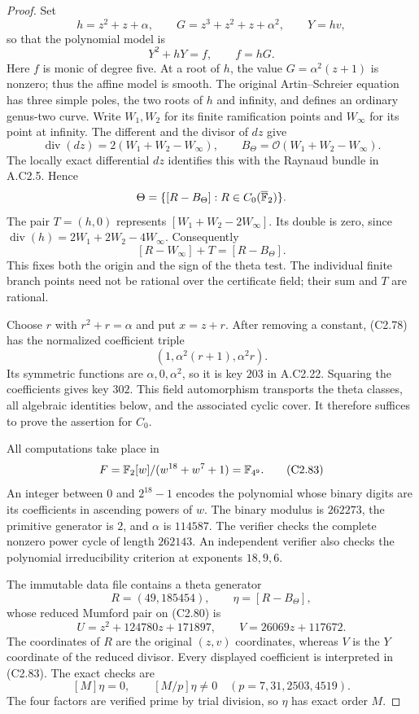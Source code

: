 \begin{proof}
Set
\[
 h=z^2+z+\alpha,\qquad G=z^3+z^2+z+\alpha^2,
 \qquad Y=hv,
\]
so that the polynomial model is
\[
                         Y^2+hY=f,\qquad f=hG.             \tag{C2.80}
\]
Here $f$ is monic of degree five. At a root
of $h$, the value $G=\alpha^2(z+1)$ is nonzero;
thus the affine model is smooth. The original
Artin--Schreier equation has three simple poles,
the two roots of $h$ and infinity, and defines
an ordinary genus-two curve. Write $W_1,W_2$
for its finite ramification points and $W_\infty$
for its point at infinity. The different and
the divisor of $dz$ give
\[
 \operatorname{div}(dz)=2(W_1+W_2-W_\infty),\qquad
 B_\Theta=\mathcal O(W_1+W_2-W_\infty).                     \tag{C2.81}
\]
The locally exact differential $dz$ identifies
this with the Raynaud bundle in A.C2.5. Hence
\[
 \Theta=\{[R-B_\Theta]:R\in C_0(\overline{\mathbb F}_2)\}.
\]
The pair $T=(h,0)$ represents
$[W_1+W_2-2W_\infty]$. Its double is zero,
since $\operatorname{div}(h)=2W_1+2W_2-4W_\infty$.
Consequently
\[
                  [R-W_\infty]+T=[R-B_\Theta].             \tag{C2.82}
\]
This fixes both the origin and the sign of the
theta test. The individual finite branch points
need not be rational over the certificate field;
their sum and $T$ are rational.

Choose $r$ with $r^2+r=\alpha$ and put $x=z+r$.
After removing a constant, (C2.78) has the
normalized coefficient triple
\[
                 (1,\alpha^2(r+1),\alpha^2r).
\]
Its symmetric functions are $\alpha,0,\alpha^2$,
so it is key $203$ in A.C2.22. Squaring the
coefficients gives key $302$. This field
automorphism transports the theta classes,
all algebraic identities below, and the
associated cyclic cover. It therefore suffices
to prove the assertion for $C_0$.

All computations take place in
\[
 F=\mathbb F_2[w]/(w^{18}+w^7+1)=\mathbb F_{4^9}.                         \tag{C2.83}
\]
An integer between $0$ and $2^{18}-1$ encodes
the polynomial whose binary digits are its
coefficients in ascending powers of $w$.
The binary modulus is $262273$, the primitive
generator is $2$, and $\alpha$ is $114587$.
The verifier checks the complete nonzero
power cycle of length $262143$. An independent
verifier also checks the polynomial
irreducibility criterion at exponents $18,9,6$.

The immutable data file
contains a theta generator
\[
 R=(49,185454),\qquad \eta=[R-B_\Theta],
\]
whose reduced Mumford pair on (C2.80) is
\[
 U=z^2+124780z+171897,
 \qquad V=26069z+117672.                                   \tag{C2.84}
\]
The coordinates of $R$ are the original $(z,v)$
coordinates, whereas $V$ is the $Y$ coordinate
of the reduced divisor. Every displayed
coefficient is interpreted in (C2.83).
The exact checks are
\[
 [M]\eta=0,\qquad [M/p]\eta\ne0
       \quad(p=7,31,2503,4519).                             \tag{C2.85}
\]
The four factors are verified prime by trial
division, so $\eta$ has exact order $M$.


\end{proof}
